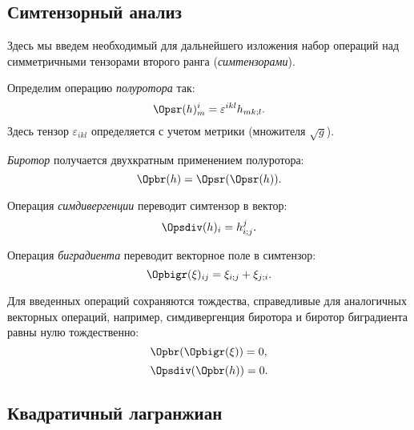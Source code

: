 \documentclass[\docroot/reports/draft/report.tex]{subfiles}
\begin{document}
\onlyinsubfile{\tableofcontents}

\subsection{Симтензорный анализ}

    Здесь мы введем необходимый для дальнейшего изложения набор операций над симметричными тензорами второго ранга (\textit{симтензорами}).

    Определим операцию \textit{полуротора} так:
    \begin{equation}\label{eq:sr}
        \Opsr(h)^i_m = \varepsilon^{ikl} h_{mk;l} .
    \end{equation}
    Здесь тензор $\varepsilon_{ikl}$ определяется с учетом метрики (множителя $\sqrt{g}$).

    \textit{Биротор} получается двухкратным применением полуротора:
    \begin{equation}\label{eq:br}
        \Opbr(h) = \Opsr(\Opsr(h)) .
    \end{equation}

    Операция \textit{симдивергенции} переводит симтензор в вектор:
    \begin{equation}\label{eq:sdiv}
        \Opsdiv(h)_i = h^j_{i;j} .
    \end{equation}

    Операция \textit{биградиента} переводит векторное поле в симтензор:
    \begin{equation}\label{eq:bigr}
        \Opbigr(\xi)_{ij} = \xi_{i;j} + \xi_{j;i}.
    \end{equation}

    Для введенных операций сохраняются тождества, справедливые для аналогичных векторных операций, например, симдивергенция биротора и биротор биградиента равны нулю тождественно:
    \begin{equation}\label{eq:br-of-bigr}
        \Opbr(\Opbigr(\xi)) = 0,
    \end{equation}
    \begin{equation}\label{eq:sdiv-of-br}
        \Opsdiv(\Opbr(h)) = 0.
    \end{equation}

\subsection{Квадратичный лагранжиан}
\end{document}
